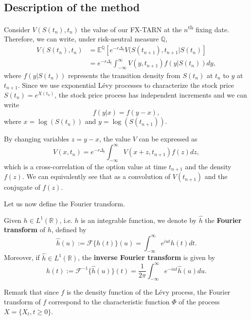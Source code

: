 \subsection{Description of the method}
Consider $V(S(t_n),t_n)$ the value of our FX-TARN at the $n$\textsuperscript{th} fixing date. Therefore, we can write, under risk-neutral measure $\mathbb{Q}$,
\begin{align*}
V(S(t_n),t_n) &= \mathbb{E}^\mathbb{Q}\left[e^{-r\Delta_t}V(S(t_{n+1}),t_{n+1}|S(t_n)\right]\\
&=e^{-r\Delta_t}\int_{-\infty}^\infty V(y,t_{n+1})f(y|S(t_n))dy,
\end{align*}
where $f(y|S(t_n))$ represents the transition density from $S(t_n)$ at $t_n$ to $y$ at $t_{n+1}$. Since we use exponential L\'evy processes to characterize the stock price $S(t_n) = e^{X(t_n)}$, the stock price process has independent increments and we can write
$$f(y|x) = f(y-x),$$
where $x = \log(S(t_n))$ and $y = \log(S(t_{n+1}))$.

By changing variables $z = y-x$, the value $V$ can be expressed as
\begin{equation}\label{conv}
V(x,t_n) = e^{-r\Delta_t}\int_{-\infty}^\infty V(x+z,t_{n+1})f(z)dz,
\end{equation}
which is a cross-correlation of the option value at time $t_{n+1}$ and the density $f(z)$. We can equivalently see that as a convolution of $V(t_{n+1})$ and the conjugate of $f(z)$.

Let us now define the Fourier transform.

\begin{defn}\label{def:conv:FT}
Given $h\in L^1(\mathbb{R})$, i.e. $h$ is an integrable function, we denote by $\hat{h}$ the \textbf{Fourier transform} of $h$, defined by
$$\hat{h}(u) := \mathcal{F}\{h(t)\}(u) = \int_{-\infty}^\infty e^{iut} h(t) dt.$$
Moreover, if $\hat{h}\in L^1(\mathbb{R})$, the \textbf{inverse Fourier transform} is given by
$$h(t):=\mathcal{F}^{-1}\{\hat{h}(u)\}(t) = \frac{1}{2\pi}\int_{-\infty}^\infty e^{-iut}\hat{h}(u)du.$$
\end{defn}
Remark that since $f$ is the density function of the L\'evy process, the Fourier transform of $f$ correspond to the characteristic function $\Phi$ of the process $X = \{X_t,t\geq 0\}$.

